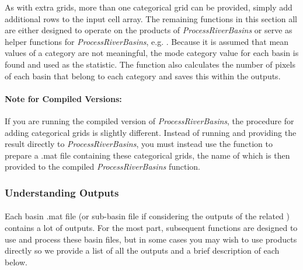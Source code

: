 \noindent
As with extra grids, more than one categorical grid can be provided, simply add additional rows to the input cell array. The remaining functions in this section all are either designed to operate on the products of \textit{ProcessRiverBasins} or serve as helper functions for \textit{ProcessRiverBasins}, e.g. . Because it is assumed that mean values of a category are not meaningful, the mode category value for each basin is found and used as the statistic. The function also calculates the number of pixels of each basin that belong to each category and saves this within the outputs.

\paragraph{Note for Compiled Versions:} If you are running the compiled version of \textit{ProcessRiverBasins}, the procedure for adding categorical grids is slightly different. Instead of running  and providing the result directly to \textit{ProcessRiverBasins}, you must instead use the  function to prepare a .mat file containing these categorical grids, the name of which is then provided to the compiled \textit{ProcessRiverBasins} function.

\subsubsection{Understanding Outputs} \label{sec:UndOuts}
\paragraph{}Each basin .mat file (or sub-basin file if considering the outputs of the related ) contains a lot of outputs. For the most part, subsequent functions are designed to use and process these basin files, but in some cases you may wish to use products directly so we provide a list of all the outputs and a brief description of each below.

